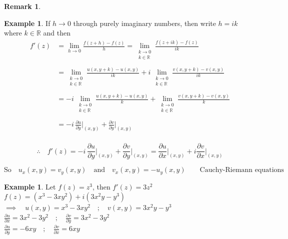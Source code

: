 \documentclass[11pt,a4paper]{article}
\theoremstyle{definition}
\newtheorem{example}[thm]{Example}
\newtheorem{remark}[thm]{Remark}
\begin{document}
\begin{remark}
\begin{example}
If $h \longrightarrow 0$ through purely imaginary numbers, then write $h = ik$ where $k\in \mathbb{R}$ and then 
\begin{align*}
f'(z) & = \lim_{h \rightarrow 0 } \frac{f(z + h) - f(z)}{h} = \lim_{\substack{k \rightarrow 0\\k\in \mathbb{R}}}\frac{f(z + ik) - f(z) }{ik}\\\\
& = \lim_{\substack{k \rightarrow 0\\k\in \mathbb{R}}} \frac{u(x, y + k) - u(x,y)}{ik} + i\,\lim_{\substack{k \rightarrow 0\\k\in \mathbb{R}}}\frac{v(x,y + k) - v(x,y)}{ik}\\\\
& = -i\,\lim_{\substack{k \rightarrow 0\\k\in \mathbb{R}}}\frac{u(x, y + k) - u(x,y)}{k} + \lim_{\substack{k \rightarrow 0\\k\in \mathbb{R}}}\frac{v(x, y + k) - v(x,y)}{k}\\\\
& = -i\,\frac{\partial u}{\partial y }\Bigg|_{(x,y)} + \frac{\partial v}{\partial y }\Bigg|_{(x,y)}\\
\end{align*}


$$\therefore\quad  f'(z) =  -i\,\frac{\partial u}{\partial y }\Bigg|_{(x,y)} + \frac{\partial v}{\partial y }\Bigg|_{(x,y)} =  \frac{\partial u}{\partial x}\Bigg|_{(x,y)} + i \frac{\partial v}{\partial x}\Bigg|_{(x,y)}$$


$$\boxed{\text{So}\quad  u_x(x,y) = v_y(x,y) \quad  \text{and}\quad  v_x(x,y) = -u_y(x,y)\qquad \text{Cauchy-Riemann equations}}$$
\end{example}

\begin{example}
Let $f(z) = z^3$, then $f'(z) = 3z^2$\\

$f(z) = (x^3 - 3xy^2) + i (3x^2 y  - y^3)$\\

$\implies \quad  u(x,y) = x^3  - 3xy^2\quad ;\quad  v(x,y) = 3x^2y - y^3$\\

$\frac{\partial u}{\partial x} = 3x^2 - 3y^2\quad ;\quad  \frac{\partial v}{\partial y} = 3x^2 - 3y^2$\\

$\frac{\partial u}{\partial y} = -6xy\quad  ;\quad  \frac{\partial v}{\partial x} = 6xy$\\\\






\end{example}
\end{remark}
\end{document}
